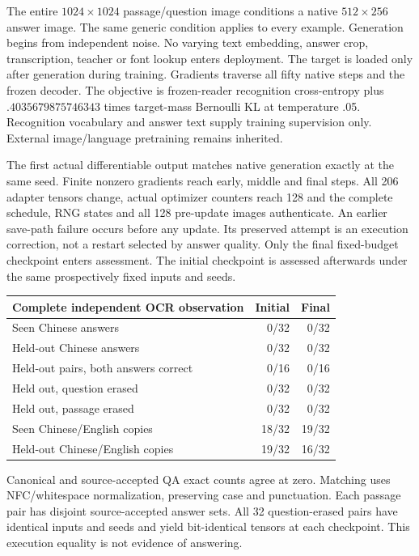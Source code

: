 \documentclass[10pt,a4paper]{article}
\begin{document}
The entire $1024\times1024$ passage/question image conditions a native
$512\times256$ answer image. The same generic condition applies to every
example. Generation begins from independent noise. No varying text embedding,
answer crop, transcription, teacher or font lookup enters deployment. The
target is loaded only after generation during training. Gradients traverse
all fifty native steps and the frozen decoder. The objective is frozen-reader
recognition cross-entropy plus $.4035679875746343$ times target-mass Bernoulli
KL at temperature .05. Recognition vocabulary and answer text supply training
supervision only. External image/language pretraining remains inherited.

The first actual differentiable output matches native generation exactly at
the same seed. Finite nonzero gradients reach early, middle and final steps.
All 206 adapter tensors change, actual optimizer counters reach 128 and the
complete schedule, RNG states and all 128 pre-update images authenticate.
An earlier save-path failure occurs before any update. Its preserved attempt
is an execution correction, not a restart selected by answer quality. Only
the final fixed-budget checkpoint enters assessment. The initial checkpoint
is assessed afterwards under the same prospectively fixed inputs and seeds.

\begin{center}\small
\begin{tabular}{lrr}
\toprule
Complete independent OCR observation & Initial & Final\\
\midrule
Seen Chinese answers & 0/32 & 0/32\\
Held-out Chinese answers & 0/32 & 0/32\\
Held-out pairs, both answers correct & 0/16 & 0/16\\
Held out, question erased & 0/32 & 0/32\\
Held out, passage erased & 0/32 & 0/32\\
Seen Chinese/English copies & 18/32 & 19/32\\
Held-out Chinese/English copies & 19/32 & 16/32\\
\bottomrule
\end{tabular}
\end{center}

Canonical and source-accepted QA exact counts agree at zero. Matching uses
NFC/whitespace normalization, preserving case and punctuation. Each passage
pair has disjoint source-accepted answer sets. All 32 question-erased pairs
have identical inputs and seeds and yield bit-identical tensors at each
checkpoint. This execution equality is not evidence of answering.
\end{document}
